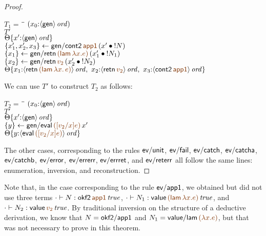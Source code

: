 \begin{proof}
\begin{description}
\begin{tabbing}
$T_1 = ~$ \= \qquad \= $(x_0{:}{\langle {\sf gen} \rangle}\,{{\it ord}})$
\\
\>$T'$
\\
\>\>${\Theta}\{{x'{:}{\langle {\sf gen} \rangle}\,{{\it ord}}}\}$
\\
\>$\trstep{x_1', x_2', x_3}
     {{\sf gen/cont2}\,\lf{\sf app1}\,(\tfuser{x'}{\tbangr{N}})}$
\\
\>$\trstep{x_1}
     {{\sf gen/retn}\,\lf{({\sf lam}\,\lambda x.e)}\,
        (\tfuser{x_1'}{\tbangr{N_1}})}$ 
\\
\>$\trstep{x_2}
     {{\sf gen/retn}\,\lf{v_2}\,(\tfuser{x_2'}{\tbangr{N_2}})}$
\\
\>\>$\tackon{\Theta}{x_1{:}\istrue{\susp{{\sf retn}\,\lf{({\sf lam}\,\lambda x.\,e)}}}, ~
                   x_2{:}\istrue{\susp{{\sf retn}\,\lf{v_2}}}, ~
                   x_3{:}\istrue{\susp{{\sf cont2}\,\lf{\sf app1}}}}$
\end{tabbing}

We can use $T'$ to construct $T_2$ as follows:
\begin{tabbing}
$T_2 = ~$ \= \qquad \= $(x_0{:}{\langle {\sf gen} \rangle}\,{{\it ord}})$
\\
\>$T'$
\\
\>\>${\Theta}\{{x'{:}{\langle {\sf gen} \rangle}\,{{\it ord}}}\}$
\\
\>$\trstep{y}
     {{\sf gen/eval}\,\lf{([v_2/x]e)}\,x'}$
\\
\>\>$\tackon{\Theta}{y{:}\istrue{\susp{{\sf eval}\,\lf{([v_2/x]e)}}}}$
\end{tabbing}


\end{description}

\noindent
The other cases, corresponding to the rules ${\sf ev/unit}$, ${\sf
  ev/fail}$, ${\sf ev/catch}$, ${\sf ev/catcha}$, ${\sf ev/catchb}$,
${\sf ev/error}$, ${\sf ev/errerr}$, ${\sf ev/errret}$, and ${\sf
  ev/reterr}$ all follow the same lines: enumeration, inversion, and
reconstruction. 
\end{proof}

Note that, in the case corresponding to the rule ${\sf ev/app1}$, we
obtained but did not use three terms $\cdot \vdash N : \isconc{{{\sf
    okf2}\,\lf{\sf app1}}}$, $\cdot \vdash N_1 : \isconc{{\sf value}\,\lf{({\sf
    lam}\,\lambda x.e)}}$, and $\cdot \vdash N_2 : \isconc{{{\sf
    value}\,\lf{v_2}}}$. By traditional inversion on the structure of a
deductive derivation, we know that $N = {\sf okf2/app1}$ and $N_1 =
{\sf value/lam}\,\lf{(\lambda x.e)}$, but that was not necessary to prove
in
this theorem.


